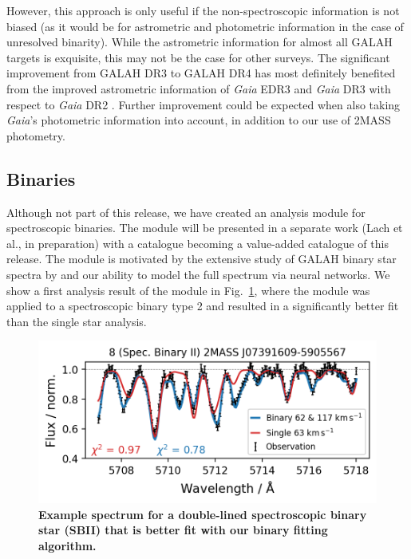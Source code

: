 \documentclass[
  journal=pasa,
  manuscript=research-paper, %
  year=2024,
  volume=37
]{cup-journal}
\begin{document}
However, this approach is only useful if the non-spectroscopic information is not biased (as it would be for astrometric and photometric information in the case of unresolved binarity). While the astrometric information for almost all GALAH targets is exquisite, this may not be the case for other surveys. The significant improvement from GALAH DR3 to GALAH DR4 has most definitely benefited from the improved astrometric information of \textit{Gaia} EDR3 \citep{GaiaEDR3, Lindegren2021a} and \textit{Gaia} DR3 \citep{GaiaDR3} with respect to \textit{Gaia} DR2 \citep{Brown2018, Lindegren2018}. Further improvement could be expected when also taking \textit{Gaia}'s photometric information into account, in addition to our use of 2MASS photometry.

\subsection{Binaries} \label{sec:caveats_binaries}

Although not part of this release, we have created an analysis module for spectroscopic binaries. The module will be presented in a separate work (Lach et al., in preparation) with a catalogue becoming a value-added catalogue of this release. The module is motivated by the extensive study of GALAH binary star spectra by \citet{Traven2020} and our ability to model the full spectrum via neural networks. We show a first analysis result of the module in Fig.~\ref{fig:examples_flag_sp_3}, where the module was applied to a spectroscopic binary type 2 and resulted in a significantly better fit than the single star analysis.

\begin{figure}[ht]
 \centering
 \includegraphics[width=\textwidth]{figures/examples_flag_sp_3.png}
 \caption{\textbf{Example spectrum for a double-lined spectroscopic binary star (SBII) that is better fit with our binary fitting algorithm.}} \label{fig:examples_flag_sp_3}
\end{figure}
\end{document}
